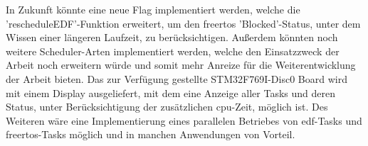 \documentclass[../EDF Master Thesis.tex]{subfiles}
\begin{document}
    \clearpage

    In Zukunft könnte eine neue Flag implementiert werden, welche die 'rescheduleEDF'-Funktion erweitert, um den \ac{freertos} 'Blocked'-Status, unter dem Wissen einer längeren Laufzeit, zu berücksichtigen. 
    Außerdem könnten noch weitere Scheduler-Arten implementiert werden, welche den Einsatzzweck der Arbeit noch erweitern würde und somit mehr Anreize für die Weiterentwicklung der Arbeit bieten.
    Das zur Verfügung gestellte STM32F769I-Disc0 Board wird mit einem Display ausgeliefert, mit dem eine Anzeige aller Tasks und deren Status, unter Berücksichtigung der zusätzlichen \ac{cpu}-Zeit, möglich ist.
    Des Weiteren wäre eine Implementierung eines parallelen Betriebes von \ac{edf}-Tasks und \ac{freertos}-Tasks möglich und in manchen Anwendungen von Vorteil. 
    
\end{document}
